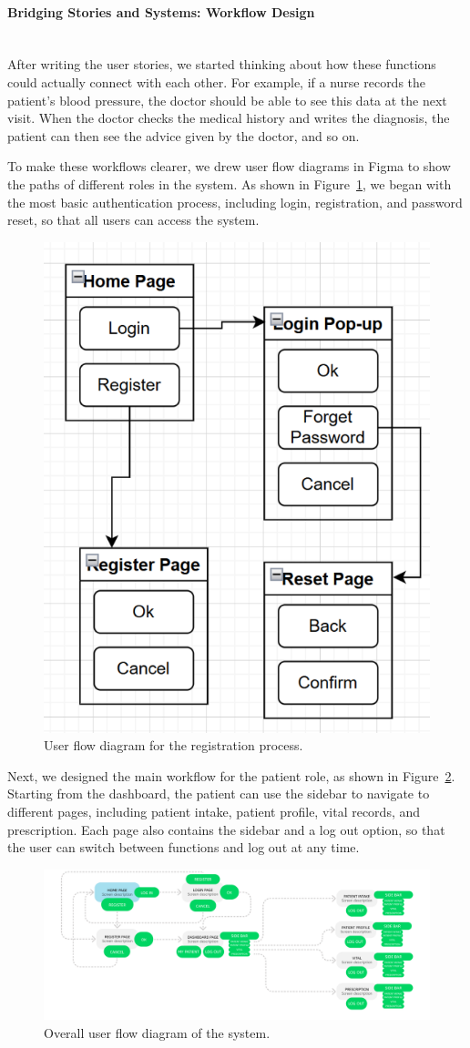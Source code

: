 \paragraph{Bridging Stories and Systems: Workflow Design}\mbox{}\\

After writing the user stories, we started thinking about how these functions could actually connect with each other. For example, if a nurse records the patient’s blood pressure, the doctor should be able to see this data at the next visit. When the doctor checks the medical history and writes the diagnosis, the patient can then see the advice given by the doctor, and so on. 

To make these workflows clearer, we drew user flow diagrams in Figma to show the paths of different roles in the system. As shown in Figure~\ref{fig:userflow-registration}, we began with the most basic authentication process, including login, registration, and password reset, so that all users can access the system.

\begin{figure}[H]
   \centering
   \includegraphics[width=0.4\linewidth]{../../images/userflow_registration.png}
   \caption{User flow diagram for the registration process.}
   \label{fig:userflow-registration}
\end{figure}

Next, we designed the main workflow for the patient role, as shown in Figure~\ref{fig:userflow-whole}. Starting from the dashboard, the patient can use the sidebar to navigate to different pages, including patient intake, patient profile, vital records, and prescription. Each page also contains the sidebar and a log out option, so that the user can switch between functions and log out at any time.
\begin{figure}[H]
   \centering
   \includegraphics[width=1.1\linewidth]{../../images/userflow_whole.png}
   \caption{Overall user flow diagram of the system.}
   \label{fig:userflow-whole}
\end{figure}


